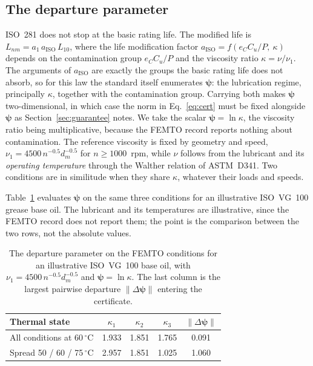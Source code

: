 \documentclass[review,times]{elsarticle}
\theoremstyle{definition}
\theoremstyle{remark}
\begin{document}
\subsection*{The departure parameter}
ISO~281 does not stop at the basic rating life. The modified life is
$L_{nm}=a_1\,a_{\mathrm{ISO}}\,L_{10}$, where the life modification factor
$a_{\mathrm{ISO}}=f(e_C C_u/P,\ \kappa)$ depends on the contamination group $e_C C_u/P$ and the
viscosity ratio $\kappa=\nu/\nu_1$. The arguments of $a_{\mathrm{ISO}}$ are exactly the groups the
basic rating life does not absorb, so for this law the standard itself enumerates
$\boldsymbol\psi$: the lubrication regime, principally $\kappa$, together with the contamination
group. Carrying both makes $\boldsymbol\psi$ two-dimensional, in which case the norm in
Eq.~\eqref{eq:cert} must be fixed alongside $\boldsymbol\psi$ as Section~\ref{sec:guarantee} notes. We
take the scalar $\boldsymbol\psi=\ln\kappa$, the viscosity ratio being multiplicative, because the FEMTO
record reports nothing about contamination. The reference
viscosity is fixed by geometry and speed, $\nu_1=4500\,n^{-0.5}d_m^{-0.5}$ for $n\ge1000$~rpm, while
$\nu$ follows from the lubricant and its \emph{operating temperature} through the Walther relation
of ASTM~D341. Two conditions are in similitude when they share $\kappa$, whatever their loads and
speeds.

Table~\ref{tab:bearing-psi} evaluates $\boldsymbol\psi$ on the same three conditions for an
illustrative ISO~VG~100 grease base oil. The lubricant and its temperatures are illustrative, since
the FEMTO record does not report them; the point is the comparison between the two rows, not the
absolute values.

\begin{table}[h]\centering\footnotesize
\setlength{\tabcolsep}{9pt}\renewcommand{\arraystretch}{1.2}
\caption{The departure parameter on the FEMTO conditions for an illustrative ISO~VG~100 base oil,
with $\nu_1=4500\,n^{-0.5}d_m^{-0.5}$ and $\boldsymbol\psi=\ln\kappa$. The last column is the
largest pairwise departure $\lVert\Delta\boldsymbol\psi\rVert$ entering the
certificate.}\label{tab:bearing-psi}
\begin{tabular}{@{}lcccc@{}}\toprule
Thermal state & $\kappa_1$ & $\kappa_2$ & $\kappa_3$ & $\lVert\Delta\boldsymbol\psi\rVert$ \\\midrule
All conditions at 60\,$^\circ$C            & 1.933 & 1.851 & 1.765 & 0.091 \\
Spread 50 / 60 / 75\,$^\circ$C             & 2.957 & 1.851 & 1.025 & 1.060 \\\bottomrule
\end{tabular}
\end{table}
\end{document}
